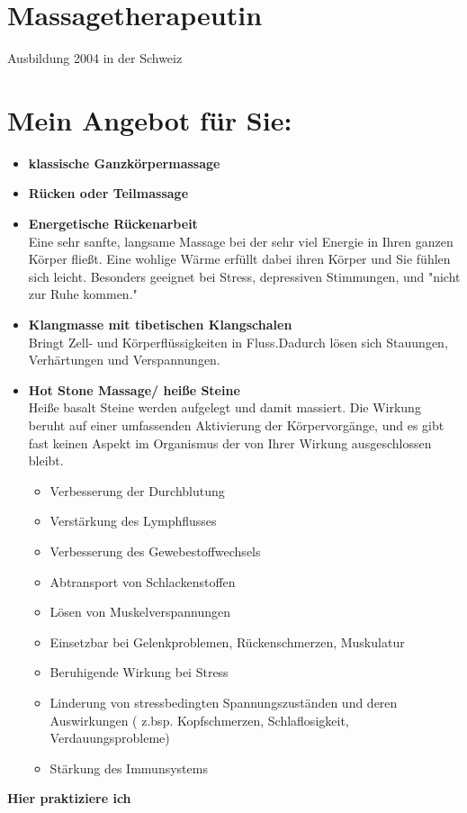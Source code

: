 \documentclass[10pt,foldmark,notumble]{leaflet}
\begin{document}
\newpage

\section{Massagetherapeutin}
Ausbildung 2004 in der Schweiz

\section{Mein Angebot für Sie:}

\begin{itemize}
\item {\bf klassische Ganzkörpermassage} \\
\item  {\bf Rücken oder Teilmassage} \\               
\item  {\bf Energetische Rückenarbeit}\\                
Eine sehr sanfte, langsame Massage bei der sehr viel Energie in Ihren ganzen Körper fließt. Eine wohlige Wärme erfüllt dabei ihren Körper und Sie fühlen sich leicht. Besonders geeignet bei Stress, depressiven Stimmungen, und "nicht zur Ruhe kommen."\\
\item  {\bf Klangmasse mit tibetischen Klangschalen}\\
Bringt Zell- und Körperflüssigkeiten in Fluss.Dadurch lösen sich Stauungen, Verhärtungen und Verspannungen.\\
\item  {\bf Hot Stone Massage/ heiße Steine}\\
Heiße basalt Steine werden aufgelegt und damit massiert. Die Wirkung beruht auf einer umfassenden Aktivierung der Körpervorgänge, und es gibt fast keinen Aspekt im Organismus der von Ihrer Wirkung ausgeschlossen bleibt.\\
\begin{itemize}
\item Verbesserung der Durchblutung
\item Verstärkung des Lymphflusses 
\item Verbesserung des Gewebestoffwechsels
\item Abtransport von Schlackenstoffen
\item Lösen von Muskelverspannungen
\item Einsetzbar bei Gelenkproblemen, Rückenschmerzen, Muskulatur
\item Beruhigende Wirkung bei Stress
\item Linderung von stressbedingten Spannungszuständen und deren Auswirkungen ( z.bsp. Kopfschmerzen, Schlaflosigkeit, Verdauungsprobleme) 
\item Stärkung des Immunsystems
\end{itemize}
\end{itemize}
%
\newpage
\vspace*{15mm}
\centerline {\LARGE {\bf {Hier praktiziere ich}}}
\end{document}

